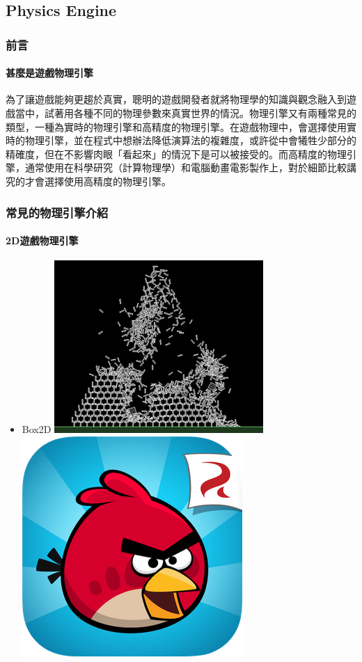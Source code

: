 \subsection{Physics Engine}
\label{sub:Physics Engine}

\subsubsection{前言}

\paragraph{甚麼是遊戲物理引擎}

為了讓遊戲能夠更趨於真實，聰明的遊戲開發者就將物理學的知識與觀念融入到遊戲當中，試著用各種不同的物理參數來真實世界的情況。物理引擎又有兩種常見的類型，一種為實時的物理引擎和高精度的物理引擎。在遊戲物理中，會選擇使用實時的物理引擎，並在程式中想辦法降低演算法的複雜度，或許從中會犧牲少部分的精確度，但在不影響肉眼「看起來」的情況下是可以被接受的。而高精度的物理引擎，通常使用在科學研究（計算物理學）和電腦動畫電影製作上，對於細節比較講究的才會選擇使用高精度的物理引擎。

\subsubsection{常見的物理引擎介紹}

\paragraph{2D遊戲物理引擎}
\begin{itemize}
    \item{Box2D}
        \includegraphics[height=0.2\linewidth]{./resources/physics/box2d(1).png} 
                \includegraphics[width=0.1\linewidth]{./resources/physics/angryBird.png}
\end{itemize}

